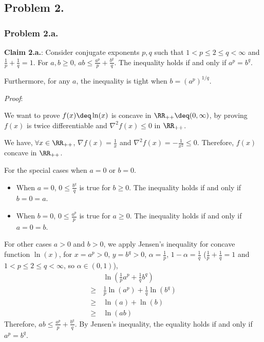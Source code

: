 
\newpage
\subsection*{Problem 2.}

\subsubsection*{Problem 2.a.}

\textbf{Claim 2.a.}: Consider conjugate exponents $p, q$ such that $1 < p \le 2 \le q < \infty$ and $\frac{1}{p} + \frac{1}{q} = 1$. For $a,b \ge 0,\, ab \le \frac{a^p}{p} + \frac{b^q}{q}$. The inequality holds if and only if $a^p = b^q$.

Furthermore, for any $a$, the inequality is tight when $b = (a^p)^{1/q}$.

\textit{Proof}:

We want to prove $f(x) \deq \ln(x)$ is concave in $\RR_{++} \deq (0,\infty)$, by proving $f(x)$ is twice differentiable and $\nabla^2 f(x) \le 0$ in $\RR_{++}$.

We have, $\forall x \in \RR_{++}$, $\nabla f(x) = \frac{1}{x}$ and $\nabla^2 f(x) = -\frac{1}{x^2} \le 0$. Therefore, $f(x)$ concave in $\RR_{++}$.

For the special cases when $a = 0$ or $b = 0$.
\begin{itemize}
\item When $a = 0$, $0 \le \frac{b^q}{q}$ is true for $b \ge 0$. The inequality holds if and only if $b = 0 = a$.
\item When $b = 0$, $0 \le \frac{a^p}{p}$ is true for $a \ge 0$. The inequality holds if and only if $a = 0 = b$.
\end{itemize}

For other cases $a > 0$ and $b > 0$, we apply Jensen's inequality for concave function $\ln(x)$, for $x=a^p > 0$, $y=b^q > 0$, $\alpha = \frac{1}{p}$, $1-\alpha = \frac{1}{q}$ ($\frac{1}{p} + \frac{1}{q} = 1$ and $1 < p \le 2 \le q < \infty$, so $\alpha \in (0,1)$),
\begin{align*}
  &\ln(\frac{1}{p} a^p + \frac{1}{q} b^q ) \\
  \ge\,&\frac{1}{p}\ln(a^p) + \frac{1}{q}\ln(b^q) \\
  \ge\,&\ln(a) + \ln(b) \\
  \ge\,&\ln(ab)
\end{align*}
Therefore, $ab \le \frac{a^p}{p}  + \frac{b^q}{q}$. By Jensen's inequality, the equality holds if and only if $a^p = b^q$.

